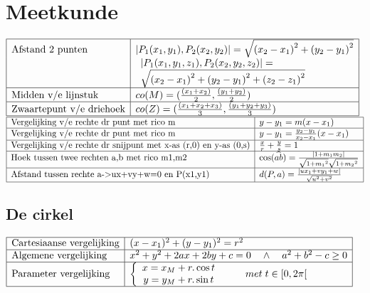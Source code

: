 \documentclass[a5paper]{article}
\begin{document}
\section{Meetkunde}

$
\begin{array}{|l|l|}
\hline
\text{Afstand 2 punten} & \left| {{P_1}({x_1},{y_1}),{P_2}({x_2},{y_2})} \right| = \sqrt {{{({x_2} - {x_1})}^2} + {{({y_2} - {y_1})}^2}}  \\
 & \begin{array}{l}
\left| {{P_1}({x_1},{y_1},{z_1}),{P_2}({x_2},{y_2},{z_2})} \right| = \\
\sqrt {{{({x_2} - {x_1})}^2} + {{({y_2} - {y_1})}^2} + {{({z_2} - {z_1})}^2}} 
\end{array} \\
\hline
\text{Midden v/e lijnstuk} & co(M) = (\frac{{({x_1} + {x_2})}}{2},\frac{{({y_1} + {y_2})}}{2})\\
\hline
\text{Zwaartepunt v/e driehoek} & co(Z) = (\frac{{({x_1} + {x_2} + {x_3})}}{3},\frac{{({y_1} + {y_2} + {y_3})}}{3})\\
\hline
\end{array}
$
\newline
$
\begin{array}{|l|l|}
\hline
\text{Vergelijking v/e rechte dr punt met rico m} & y - {y_1} = m(x - {x_1})  \\
\hline
\text{Vergelijking v/e rechte dr punt met rico m} & y - {y_1} = \frac{{{y_2} - {y_1}}}{{{x_2} - {x_1}}}(x - {x_1})  \\
\hline
\text{Vergelijking v/e rechte dr snijpunt met x-as (r,0) en y-as (0,s)} & \frac{x}{r} + \frac{y}{s} = 1  \\
\hline
\text{Hoek tussen twee rechten a,b met rico m1,m2} & \cos (\widehat {ab}) = \frac{{\left| {1 + {m_1}{m_2}} \right|}}{{\sqrt {1 + {m_1}^2} \sqrt {1 + {m_2}^2} }}  \\
\hline
\text{Afstand tussen rechte a->ux+vy+w=0 en P(x1,y1)} & d(P,a) = \frac{{\left| {u{x_1} + v{y_1} + w} \right|}}{{\sqrt {{u^2} + {v^2}} }}  \\
\hline
\end{array}
$

\subsection{De cirkel}

$
\begin{array}{|l|l|}
\hline
\text{Cartesiaanse vergelijking} & {(x - {x_1})^2} + {(y - {y_1})^2} = {r^2}  \\
\hline
\text{Algemene vergelijking} & {x^2} + {y^2} + 2ax + 2by + c = 0\quad  \wedge \quad {a^2} + {b^2} - c \ge 0  \\
\hline
\text{Parameter vergelijking} & \left\{ {\begin{array}{*{20}{c}}
{x = {x_M} + r.\cos t}\\
{y = {y_M} + r.\sin t}
\end{array}} \right.\;\quad \quad met\;t \in \left[ {0,2\pi } \right[  \\
\hline
\end{array}
$
\end{document}

